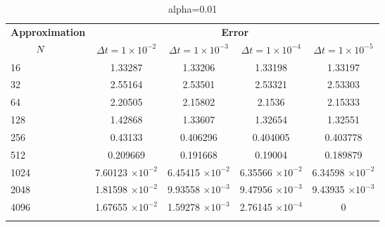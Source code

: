 	\begin{table}
		\begin{tabular}{lcccc}
			\toprule
			\multicolumn{1}{c}{\textbf{Approximation}} & \multicolumn{4}{c}{\textbf{Error}} \\
			$\hspace{9mm}N$ & $\Delta t=1\times 10^{-2}$ & $\Delta t=1\times 10^{-3}$ & $\Delta t=1\times 10^{-4}$ & $\Delta t=1\times 10^{-5}$ \\
			\midrule
			\hspace{7mm} 16 & 1.33287   & 1.33206    & 1.33198     & 1.33197    \\
			\midrule
			\hspace{7mm} 32 & 2.55164   & 2.53501    & 2.53321     & 2.53303    \\
			\midrule
			\hspace{7mm} 64 & 2.20505   & 2.15802    & 2.1536      & 2.15333    \\
			\midrule
			\hspace{7mm} 128 & 1.42868   & 1.33607    & 1.32654     & 1.32551    \\
			\midrule
			\hspace{7mm} 256 & 0.43133   & 0.406296   & 0.404005    & 0.403778   \\
			\midrule
			\hspace{7mm} 512 & 0.209669  & 0.191668   & 0.19004     & 0.189879   \\
			\midrule
			\hspace{7mm} 1024 & 7.60123 $\times 10^{-2}$ & 6.45415 $\times 10^{-2}$  & 6.35566 $\times 10^{-2}$   & 6.34598 $\times 10^{-2}$  \\
			\midrule
			\hspace{7mm} 2048 & 1.81598 $\times 10^{-2}$ & 9.93558 $\times 10^{-3}$ & 9.47956 $\times 10^{-3}$ & 9.43935 $\times 10^{-3}$ \\
			\midrule
			\hspace{7mm} 4096 & 1.67655 $\times 10^{-2}$ & 1.59278 $\times 10^{-3}$ & 2.76145 $\times 10^{-4}$ & 0          \\
			\\
			\bottomrule
		\end{tabular}
		\caption{alpha=0.01}
	\end{table}

